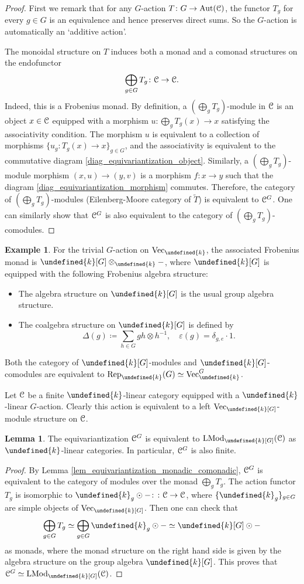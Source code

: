 \documentclass[10pt]{article}
\let\mathbb\undefined
\theoremstyle{definition}
\newtheorem{lem}[thm]{Lemma}
\newtheorem{expl}[thm]{Example}
\numberwithin{equation}{section}
\numberwithin{thm}{section}
\newcommand{\bit}{\begin{itemize}}
\newcommand{\eit}{\end{itemize}}
\newcommand{\pf}{\begin{proof}}
\newcommand{\epf}{\end{proof}}
\newcommand{\bk}{\mathbb{k}}
\newcommand{\CC}{\EuScript{C}}
\DeclareMathOperator{\Aut}{Aut}
\DeclareMathOperator{\LMod}{LMod}
\newcommand{\vect}{\mathrm{Vec}}
\newcommand{\rep}{\mathrm{Rep}}
\begin{document}
\pf
First we remark that for any $G$-action $T \colon G \to \Aut(\CC)$, the functor $T_g$ for every $g \in G$ is an equivalence and hence preserves direct sums. So the $G$-action is automatically an `additive action'.

The monoidal structure on $T$ induces both a monad and a comonad structures on the endofunctor
\[
\bigoplus_{g \in G} T_g \colon \CC \to \CC .
\]
Indeed, this is a Frobenius monad. By definition, a $(\bigoplus_g T_g)$-module in $\CC$ is an object $x \in \CC$ equipped with a morphism $u \colon \bigoplus_g T_g(x) \to x$ satisfying the associativity condition. The morphism $u$ is equivalent to a collection of morphisms $\{u_g \colon T_g(x) \to x\}_{g \in G}$, and the associativity is equivalent to the commutative diagram \eqref{diag_equivariantization_object}. Similarly, a $(\bigoplus_g T_g)$-module morphism $(x,u) \to (y,v)$ is a morphism $f \colon x \to y$ such that the diagram \eqref{diag_equivariantization_morphism} commutes. Therefore, the category of $(\bigoplus_g T_g)$-modules (Eilenberg-Moore category of $\tilde T$) is equivalent to $\CC^G$. One can similarly show that $\CC^G$ is also equivalent to the category of $(\bigoplus_g T_g)$-comodules.
\epf

\begin{expl}
For the trivial $G$-action on $\vect_\bk$, the associated Frobenius monad is $\bk[G] \otimes_\bk -$, where $\bk[G]$ is equipped with the following Frobenius algebra structure:
\bit
\item The algebra structure on $\bk[G]$ is the usual group algebra structure.
\item The coalgebra structure on $\bk[G]$ is defined by
\[
\Delta(g) \coloneqq \sum_{h \in G} gh \otimes h^{-1} , \quad \varepsilon(g) = \delta_{g,e} \cdot 1 .
\]
\eit
Both the category of $\bk[G]$-modules and $\bk[G]$-comodules are equivalent to $\rep_\bk(G) \simeq \vect_\bk^G$.
\end{expl}

Let $\CC$ be a finite $\bk$-linear category equipped with a $\bk$-linear $G$-action. Clearly this action is equivalent to a left $\vect_\bk[G]$-module structure on $\CC$.

\begin{lem} \label{lem_equivariantization_module_group_algebra}
The equivariantization $\CC^G$ is equivalent to $\LMod_{\bk[G]}(\CC)$ as $\bk$-linear categories. In particular, $\CC^G$ is also finite.
\end{lem}

\pf
By Lemma \ref{lem_equivariantization_monadic_comonadic}, $\CC^G$ is equivalent to the category of modules over the monad $\bigoplus_g T_g$. The action functor $T_g$ is isomorphic to $\bk_g \odot - \colon \colon \CC \to \CC$, where $\{\bk_g\}_{g \in G}$ are simple objects of $\vect_\bk[G]$. Then one can check that
\[
\bigoplus_{g \in G} T_g \simeq \bigoplus_{g \in G} \bk_g \odot - \simeq \bk[G] \odot -
\]
as monads, where the monad structure on the right hand side is given by the algebra structure on the group algebra $\bk[G]$. This proves that $\CC^G \simeq \LMod_{\bk[G]}(\CC)$.
\epf
\end{document}
